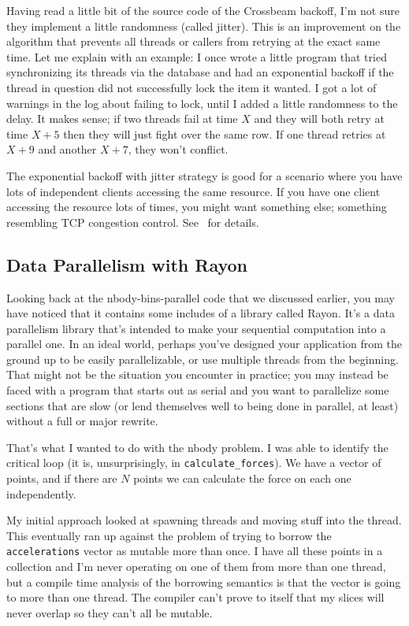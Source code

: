 Having read a little bit of the source code of the Crossbeam backoff, I'm not sure they implement a little randomness (called jitter). This is an improvement on the algorithm that prevents all threads or callers from retrying at the exact same time. Let me explain with an example: I once wrote a little program that tried synchronizing its threads via the database and had an exponential backoff if the thread in question did not successfully lock the item it wanted. I got a lot of warnings in the log about failing to lock, until I added a little randomness to the delay. It makes sense; if two threads fail at time $X$ and they will both retry at time $X+5$ then they will just fight over the same row. If one thread retries at $X+9$ and another $X+7$, they won't conflict.

The exponential backoff with jitter strategy is good for a scenario where you have lots of independent clients accessing the same resource. If you have one client accessing the resource lots of times, you might want something else; something resembling TCP congestion control. See~\cite{expbackoff} for details. 

\subsection*{Data Parallelism with Rayon}

Looking back at the nbody-bins-parallel code that we discussed earlier, you may have noticed that it contains some includes of a library called Rayon. It's a data parallelism library that's intended to make your sequential computation into a parallel one. In an ideal world, perhaps you've designed your application from the ground up to be easily parallelizable, or use multiple threads from the beginning. That might not be the situation you encounter in practice; you may instead be faced with a program that starts out as serial and you want to parallelize some sections that are slow (or lend themselves well to being done in parallel, at least) without a full or major rewrite.

That's what I wanted to do with the nbody problem. I was able to identify the critical loop (it is, unsurprisingly, in \texttt{calculate\_forces}). We have a vector of points, and if there are $N$ points we can calculate the force on each one independently. 

My initial approach looked at spawning threads and moving stuff into the thread. This eventually ran up against the problem of trying to borrow the \texttt{accelerations} vector as mutable more than once. I have all these points in a collection and I'm never operating on one of them from more than one thread, but a compile time analysis of the borrowing semantics is that the vector is going to more than one thread. The compiler can't prove to itself that my slices will never overlap so they can't all be mutable.

